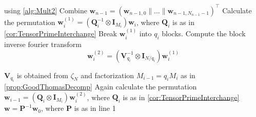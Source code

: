\begin{algorithm}[h]
\begin{algorithmic}[1]
            using \cref{alg:Mult2} 
        \EndFor
        \State Combine \(\bm{w}_{n-1} = (\bm{w}_{n-1, 0} \parallel \ldots \parallel \bm{w}_{n-1, N_{n-1} - 1})^{\top}\)
            \State Calculate the permutation \(\bm{w}_i^{(1)} = \left(\bm{Q}_i^{-1} \otimes \bm{I}_{M_i}\right) \bm{w}_i\), where \(\bm{Q}_i\) is as in \cref{cor:TensorPrimeInterchange}
            \State Break \(\bm{w}_i^{(1)}\) into \(q_i\) blocks. Compute the block inverse fourier transform
            \[\bm{w}_i^{(2)} = \left(\bm{V}_{q_i}^{-1} \otimes \bm{I}_{N/q_i}\right) \bm{w}_i^{(1)}\]

            \(\bm{V}_{q_i}\) is obtained from \(\zeta_N\) and factorization \(M_{i-1} = q_i M_i\) as in \cref{prop:GoodThomasDecomp}
            \State Again calculate the permutation \(\bm{w}_{i-1} = \left(\bm{Q}_i \otimes \bm{I}_{M_i}\right) \bm{w}_i^{(2)}\), where \(\bm{Q}_i\) is as in \cref{cor:TensorPrimeInterchange}
        \EndFor
         \(\bm{w} = \bm{P}^{-1} \bm{w}_0\), where \(\bm{P}\) is as in line 1
    \end{algorithmic}
\end{algorithm}
